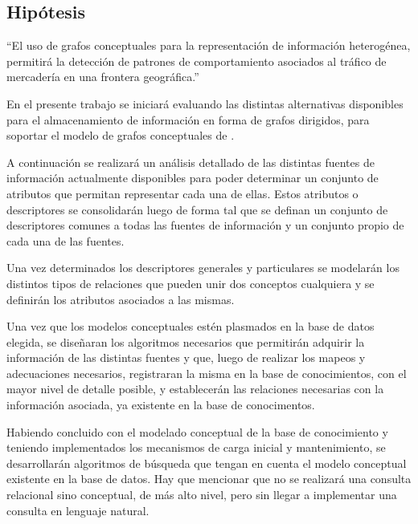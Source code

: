	
	\begin{center}
		\begin{minipage}{0.9\linewidth}
			\vspace{5pt}%
			\subsection{Hipótesis}
			``El uso de grafos conceptuales para la representación de información heterogénea, permitirá la detección de patrones de comportamiento asociados al tráfico de mercadería en una frontera geográfica.''
			\vspace{5pt}%
		\end{minipage}
	\end{center}
	
	
	En el presente trabajo se iniciará evaluando las distintas alternativas disponibles para el almacenamiento de información en forma de grafos dirigidos, para soportar el modelo de grafos conceptuales de \citeauthor{Sowa1976}.
	
	A continuación se realizará un análisis detallado de las distintas fuentes de información actualmente disponibles para poder determinar un conjunto de atributos que permitan representar cada una de ellas. Estos atributos o descriptores se consolidarán luego de forma tal que se definan un conjunto de descriptores comunes a todas las fuentes de información y un conjunto propio de cada una de las fuentes.\cite{findler2014associative}
	
	Una vez determinados los descriptores generales y particulares se modelarán los distintos tipos de relaciones que pueden unir dos conceptos cualquiera y se definirán los atributos asociados a las mismas.
	
	Una vez que los modelos conceptuales estén plasmados en la base de datos elegida, se diseñaran los algoritmos necesarios que permitirán adquirir la información de las distintas fuentes y que, luego de realizar los mapeos y adecuaciones necesarios, registraran la misma en la base de conocimientos, con el mayor nivel de detalle posible, y establecerán las relaciones necesarias con la información asociada, ya existente en la base de conocimentos.
	
	Habiendo concluido con el modelado conceptual de la base de conocimiento y teniendo implementados los mecanismos de carga inicial y mantenimiento, se desarrollarán algoritmos de búsqueda que tengan en cuenta el modelo conceptual existente en la base de datos. Hay que mencionar que no se realizará una consulta relacional sino conceptual, de más alto nivel, pero sin llegar a implementar una consulta en lenguaje natural.
	
